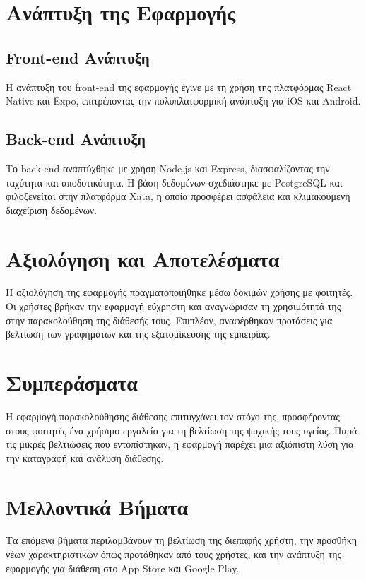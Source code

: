 \section*{Ανάπτυξη της Εφαρμογής}
\subsection*{Front-end Ανάπτυξη}
Η ανάπτυξη του front-end της εφαρμογής έγινε με τη χρήση της πλατφόρμας React Native και Expo, επιτρέποντας την πολυπλατφορμική ανάπτυξη για iOS και Android.

\subsection*{Back-end Ανάπτυξη}
Το back-end αναπτύχθηκε με χρήση Node.js και Express, διασφαλίζοντας την ταχύτητα και αποδοτικότητα. Η βάση δεδομένων σχεδιάστηκε με PostgreSQL και φιλοξενείται στην πλατφόρμα Xata, η οποία προσφέρει ασφάλεια και κλιμακούμενη διαχείριση δεδομένων.

\section*{Αξιολόγηση και Αποτελέσματα}
Η αξιολόγηση της εφαρμογής πραγματοποιήθηκε μέσω δοκιμών χρήσης με φοιτητές. Οι χρήστες βρήκαν την εφαρμογή εύχρηστη και αναγνώρισαν τη χρησιμότητά της στην παρακολούθηση της διάθεσής τους. Επιπλέον, αναφέρθηκαν προτάσεις για βελτίωση των γραφημάτων και της εξατομίκευσης της εμπειρίας.

\section*{Συμπεράσματα}
Η εφαρμογή παρακολούθησης διάθεσης επιτυγχάνει τον στόχο της, προσφέροντας στους φοιτητές ένα χρήσιμο εργαλείο για τη βελτίωση της ψυχικής τους υγείας. Παρά τις μικρές βελτιώσεις που εντοπίστηκαν, η εφαρμογή παρέχει μια αξιόπιστη λύση για την καταγραφή και ανάλυση διάθεσης.

\section*{Μελλοντικά Βήματα}
Τα επόμενα βήματα περιλαμβάνουν τη βελτίωση της διεπαφής χρήστη, την προσθήκη νέων χαρακτηριστικών όπως προτάθηκαν από τους χρήστες, και την ανάπτυξη της εφαρμογής για διάθεση στο App Store και Google Play.
